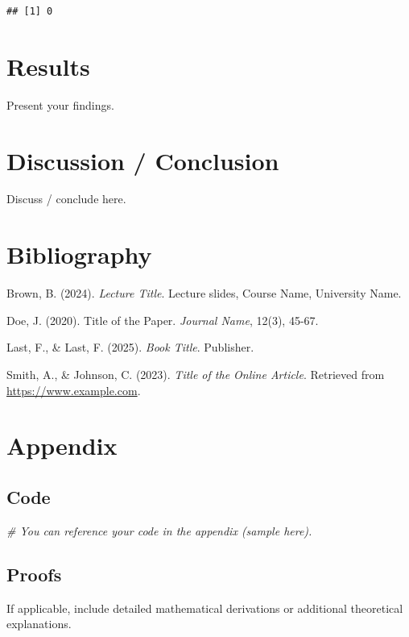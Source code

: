 \documentclass[
  11pt,
]{article}
\newenvironment{Shaded}{\begin{snugshade}}{\end{snugshade}}
\newcommand{\CommentTok}[1]{\textcolor[rgb]{0.56,0.35,0.01}{\textit{#1}}}
\begin{document}
\begin{verbatim}
## [1] 0
\end{verbatim}

\section{Results}\label{results}

Present your findings.

\section{Discussion / Conclusion}\label{discussion-conclusion}

Discuss / conclude here.

\section{Bibliography}\label{bibliography}

Brown, B. (2024). \emph{Lecture Title}. Lecture slides, Course Name,
University Name.

Doe, J. (2020). Title of the Paper. \emph{Journal Name}, 12(3), 45-67.

Last, F., \& Last, F. (2025). \emph{Book Title}. Publisher.

Smith, A., \& Johnson, C. (2023). \emph{Title of the Online Article}.
Retrieved from \url{https://www.example.com}.

\section{Appendix}\label{appendix}

\subsection{Code}\label{code}

\begin{Shaded}
\begin{Highlighting}[]
\CommentTok{\# You can reference your code in the appendix (sample here).}
\end{Highlighting}
\end{Shaded}

\subsection{Proofs}\label{proofs}

If applicable, include detailed mathematical derivations or additional
theoretical explanations.
\end{document}
